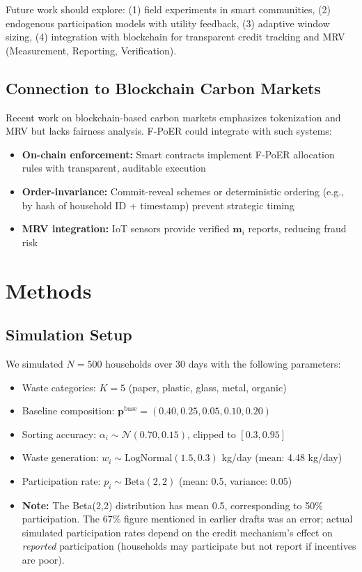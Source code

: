 \documentclass[12pt,a4paper]{article}
\begin{document}
Future work should explore: (1) field experiments in smart communities, (2) endogenous participation models with utility feedback, (3) adaptive window sizing, (4) integration with blockchain for transparent credit tracking and MRV (Measurement, Reporting, Verification)\cite{tang2023blockchain}.

\subsection{Connection to Blockchain Carbon Markets}

Recent work on blockchain-based carbon markets\cite{tang2023blockchain} emphasizes tokenization and MRV but lacks fairness analysis. F-PoER could integrate with such systems:
\begin{itemize}
    \item \textbf{On-chain enforcement:} Smart contracts implement F-PoER allocation rules with transparent, auditable execution
    \item \textbf{Order-invariance:} Commit-reveal schemes or deterministic ordering (e.g., by hash of household ID + timestamp) prevent strategic timing
    \item \textbf{MRV integration:} IoT sensors provide verified $\mathbf{m}_i$ reports, reducing fraud risk
\end{itemize}

\section{Methods}

\subsection{Simulation Setup}

We simulated $N=500$ households over 30 days with the following parameters:
\begin{itemize}
    \item Waste categories: $K=5$ (paper, plastic, glass, metal, organic)
    \item Baseline composition: $\mathbf{p}^{\text{base}} = (0.40, 0.25, 0.05, 0.10, 0.20)$
    \item Sorting accuracy: $\alpha_i \sim \mathcal{N}(0.70, 0.15)$, clipped to $[0.3, 0.95]$
    \item Waste generation: $w_i \sim \text{LogNormal}(1.5, 0.3)$ kg/day (mean: 4.48 kg/day)
    \item Participation rate: $p_i \sim \text{Beta}(2, 2)$ (mean: 0.5, variance: 0.05)
    \item \textbf{Note:} The Beta(2,2) distribution has mean 0.5, corresponding to 50\% participation. The 67\% figure mentioned in earlier drafts was an error; actual simulated participation rates depend on the credit mechanism's effect on \textit{reported} participation (households may participate but not report if incentives are poor).
\end{itemize}
\end{document}
